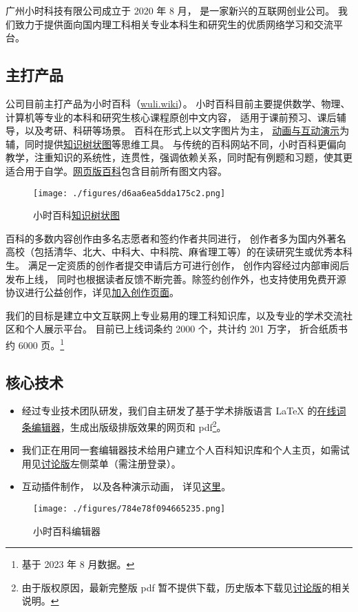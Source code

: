 
广州小时科技有限公司成立于 2020 年 8 月， 是一家新兴的互联网创业公司。 我们致力于提供面向国内理工科相关专业本科生和研究生的优质网络学习和交流平台。


\subsection{主打产品}
公司目前主打产品为小时百科（\href{https://wuli.wiki}{wuli.wiki}）。 小时百科目前主要提供数学、物理、计算机等专业的本科和研究生核心课程原创中文内容， 适用于课前预习、课后辅导，以及考研、科研等场景。 百科在形式上以文字图片为主， \href{https://wuli.wiki/apps/}{动画与互动演示}为辅，同时提供\href{https://wuli.wiki/tree/}{知识树状图}等思维工具。 与传统的百科网站不同，小时百科更偏向教学，注重知识的系统性，连贯性，强调依赖关系，同时配有例题和习题，使其更适合用于自学。\href{https://wuli.wiki/online/}{网页版百科}包含目前所有图文内容。

\begin{figure}[ht]
\centering
\texttt{[image: ./figures/d6aa6ea5dda175c2.png]}
\caption{小时百科\href{https://wuli.wiki/tree/}{知识树状图}} \label{fig_Compny_2}
\end{figure}

百科的多数内容创作由多名志愿者和签约作者共同进行， 创作者多为国内外著名高校（包括清华、北大、中科大、中科院、麻省理工等）的在读研究生或优秀本科生。 满足一定资质的创作者提交申请后方可进行创作， 创作内容经过内部审阅后发布上线， 同时也根据读者反馈不断完善。除签约创作外，也支持使用免费开源协议进行公益创作，详见\href{https://wuli.wiki/forum/f9ec7f8e-ca37-4278-a77e-ba5c0e40e115}{加入创作页面}。

我们的目标是建立中文互联网上专业易用的理工科知识库，以及专业的学术交流社区和个人展示平台。 目前已上线词条约 2000 个，共计约 201 万字， 折合纸质书约 6000 页。\footnote{基于 2023 年 8 月数据。}

\subsection{核心技术}
\begin{itemize}
\item 经过专业技术团队研发，我们自主研发了基于学术排版语言 LaTeX 的\href{https://wuli.wiki/editor/}{在线词条编辑器}，生成出版级排版效果的网页和 pdf\footnote{由于版权原因，最新完整版 pdf 暂不提供下载，历史版本下载见\href{https://wuli.wiki/forum/}{讨论版}的相关说明。}。 
\item 我们正在用同一套编辑器技术给用户建立个人百科知识库和个人主页，如需试用见\href{https://wuli.wiki/forum/}{讨论版}左侧菜单（需注册登录）。
\item 互动插件制作， 以及各种演示动画， 详见\href{http://wuli.wiki/apps}{这里}。
\end{itemize}

\begin{figure}[ht]
\centering
\texttt{[image: ./figures/784e78f094665235.png]}
\caption{小时百科编辑器} \label{fig_Compny_1}
\end{figure}
